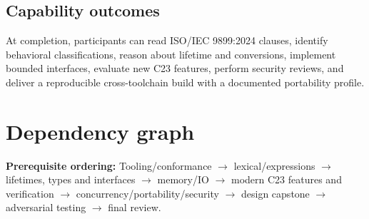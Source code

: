 \documentclass[10pt,letterpaper,oneside]{report}
\begin{document}
\section{Capability outcomes}
At completion, participants can read ISO/IEC 9899:2024 clauses, identify behavioral classifications, reason about lifetime and conversions, implement bounded interfaces, evaluate new C23 features, perform security reviews, and deliver a reproducible cross-toolchain build with a documented portability profile.
\chapter{Dependency graph}
\begin{keybox}\textbf{Prerequisite ordering:} Tooling/conformance $\to$ lexical/expressions $\to$ lifetimes, types and interfaces $\to$ memory/IO $\to$ modern C23 features and verification $\to$ concurrency/portability/security $\to$ design capstone $\to$ adversarial testing $\to$ final review.\end{keybox}
\end{document}
